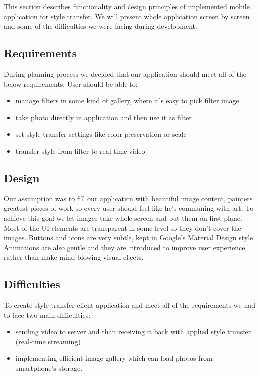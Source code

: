 \documentclass[../Main.tex]{subfiles}
\begin{document}
This section describes functionality and design principles of implemented mobile application for 
style transfer. We will present whole application screen by screen and some
of the difficulties we were facing during development.

\subsection{Requirements}
During planning process we decided that our application should meet all of the 
below requirements.
User should be able to:
\begin{itemize}
    \item manage filters in some kind of gallery, where it's easy to pick filter image
    \item take photo directly in application and then use it as filter
    \item set style transfer settings like color preservation or scale
    \item transfer style from filter to real-time video
\end{itemize}

\subsection{Design}
Our assumption was to fill our application with beautiful image content,
painters greatest pieces of work so every user should feel like he's communing with art.
To achieve this goal we let images take whole screen and put them on first plane.
Most of the UI elements are transparent in some level so they don't cover the images.
Buttons and icons are very subtle, kept in Google's Material Design style.
Animations are also gentle and they are introduced to improve user experience rather
than make mind blowing visual effects.

\subsection{Difficulties}
To create style transfer client application and meet all of the requirements
we had to face two main difficulties:
\begin{itemize}
    \item sending video to server and than receiving it back with applied style transfer (real-time streaming)
    \item implementing efficient image gallery which can load photos from smartphone's storage. 
\end{itemize}
\end{document}
